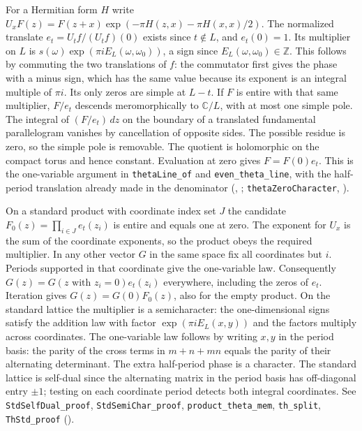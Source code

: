 For a Hermitian form $H$ write
$U_xF(z)=F(z+x)\exp(-\pi H(z,x)-\pi H(x,x)/2)$.
The normalized translate $e_t=U_tf/(U_tf)(0)$ exists since $t\notin L$,
and $e_t(0)=1$. Its multiplier on $L$ is
$s(\omega)\exp(\pi i E_L(\omega,\omega_0))$, a sign since
$E_L(\omega,\omega_0)\in\mathbb Z$. This follows by commuting the
two translations of $f$: the commutator first gives the phase with a minus sign, which has the same value because its exponent is an integral multiple of $\pi i$. Its only zeros are simple at $L-t$.
If $F$ is entire with that same multiplier, $F/e_t$ descends
meromorphically to $\mathbb C/L$, with at most one simple pole.
The integral of $(F/e_t)\,dz$ on the boundary of a translated
fundamental parallelogram vanishes by cancellation of opposite sides.
The possible residue is zero, so the simple pole is removable. The
quotient is holomorphic on the compact torus and hence constant.
Evaluation at zero gives $F=F(0)e_t$.
This is the one-variable argument in \nolinkurl{thetaLine_of} and
\nolinkurl{even_theta_line}, with the half-period translation already
made in the denominator (,
;
\nolinkurl{thetaZeroCharacter}, ).

On a standard product with coordinate index set $J$ the candidate
$F_0(z)=\prod_{i\in J}e_t(z_i)$ is entire and equals one at zero.
The exponent for $U_x$ is the sum of the coordinate exponents, so the
product obeys the required multiplier. In any other vector $G$ in the
same space fix all coordinates but $i$. Periods supported in that
coordinate give the one-variable law. Consequently
$G(z)=G(z\text{ with }z_i=0)e_t(z_i)$ everywhere, including the
zeros of $e_t$. Iteration gives $G(z)=G(0)F_0(z)$, also for the empty
product. On the standard lattice the multiplier is a semicharacter:
the one-dimensional signs satisfy the addition law with factor
$\exp(\pi i E_L(x,y))$ and the factors multiply across coordinates.
The one-variable law follows by writing $x,y$ in the period basis:
the parity of the cross terms in $m+n+mn$ equals the parity of their
alternating determinant. The extra half-period phase is a character.
The standard lattice is self-dual since the alternating matrix in
the period basis has off-diagonal entry $\pm1$; testing on each
coordinate period detects both integral coordinates.
See \nolinkurl{StdSelfDual_proof}, \nolinkurl{StdSemiChar_proof},
\nolinkurl{product_theta_mem}, \nolinkurl{th_split}, \nolinkurl{ThStd_proof}
().

